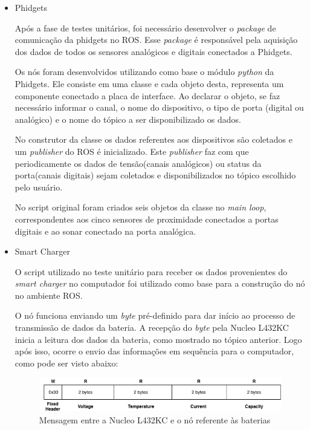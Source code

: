 		\begin{itemize}

		\item Phidgets
		
		Após a fase de testes unitários, foi necessário desenvolver o \textit{package} de comunicação da phidgets no ROS. Esse \textit{package} é responsável pela aquisição dos dados de todos os sensores analógicos e digitais conectados a Phidgets.
		
		Os nós foram desenvolvidos utilizando como base o módulo \textit{python} da Phidgets. Ele consiste em uma classe e cada objeto desta, representa um componente conectado a placa de interface. Ao declarar o objeto, se faz necessário informar o canal, o nome do dispositivo, o tipo de porta (digital ou analógico) e o nome do tópico a ser disponibilizado os dados. 
		
		No construtor da classe os dados referentes aos dispositivos são coletados e um \textit{publisher} do ROS é inicializado. Este  \textit{publisher} faz com que periodicamente os dados de tensão(canais analógicos) ou status da porta(canais digitais) sejam coletados e disponibilizados no tópico escolhido pelo usuário. 
		
		No script original foram criados seis objetos da classe no \textit{main loop}, correspondentes aos cinco sensores de proximidade conectados a portas digitais e ao sonar conectado na porta analógica.
		
		\item Smart Charger
		
		O script utilizado no teste unitário para receber os dados provenientes do \textit{smart charger} no computador foi utilizado como base para a construção do nó no ambiente ROS.
		
		O nó funciona enviando um \textit{byte} pré-definido para dar início ao processo de transmissão de dados da bateria. A recepção do \textit{byte} pela Nucleo L432KC inicia a leitura dos dados da bateria, como mostrado no tópico anterior. Logo após isso, ocorre o envio das informações em sequência para o computador, como pode ser visto abaixo:
		
		\begin{figure}[!ht]
			\centering
			\includegraphics[width=16cm]{Figures/batt_protocol_2.png}
			\caption{Mensagem entre a Nucleo L432KC e o nó referente às baterias}
			\label{fig:battprotocol2}
		\end{figure}
		

\end{itemize}
